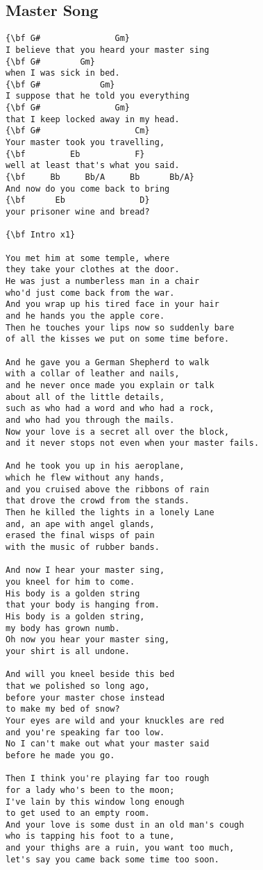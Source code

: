 \documentclass[a4paper]{article}
\begin{document}
\subsection{Master Song} %
\label{sub:Master Song}
\begin{Verbatim}[commandchars=\\\{\}]
{\bf G#			      Gm}
I believe that you heard your master sing 
{\bf G#		   Gm}
when I was sick in bed. 
{\bf G#			   Gm}
I suppose that he told you everything 
{\bf G#			      Gm}
that I keep locked away in my head. 
{\bf G#                   Cm}
Your master took you travelling, 
{\bf         Eb		      F}
well at least that's what you said. 
{\bf     Bb     Bb/A     Bb      Bb/A}
And now do you come back to bring 
{\bf      Eb		       D}
your prisoner wine and bread? 

{\bf Intro x1}

You met him at some temple, where 
they take your clothes at the door. 
He was just a numberless man in a chair 
who'd just come back from the war. 
And you wrap up his tired face in your hair 
and he hands you the apple core. 
Then he touches your lips now so suddenly bare 
of all the kisses we put on some time before. 

And he gave you a German Shepherd to walk 
with a collar of leather and nails, 
and he never once made you explain or talk 
about all of the little details, 
such as who had a word and who had a rock, 
and who had you through the mails. 
Now your love is a secret all over the block, 
and it never stops not even when your master fails. 

And he took you up in his aeroplane, 
which he flew without any hands, 
and you cruised above the ribbons of rain 
that drove the crowd from the stands. 
Then he killed the lights in a lonely Lane 
and, an ape with angel glands, 
erased the final wisps of pain 
with the music of rubber bands. 

And now I hear your master sing, 
you kneel for him to come. 
His body is a golden string 
that your body is hanging from. 
His body is a golden string, 
my body has grown numb. 
Oh now you hear your master sing, 
your shirt is all undone. 

And will you kneel beside this bed 
that we polished so long ago, 
before your master chose instead 
to make my bed of snow? 
Your eyes are wild and your knuckles are red 
and you're speaking far too low. 
No I can't make out what your master said 
before he made you go. 

Then I think you're playing far too rough 
for a lady who's been to the moon; 
I've lain by this window long enough 
to get used to an empty room. 
And your love is some dust in an old man's cough 
who is tapping his foot to a tune, 
and your thighs are a ruin, you want too much, 
let's say you came back some time too soon. 


\end{Verbatim}
\end{document}
